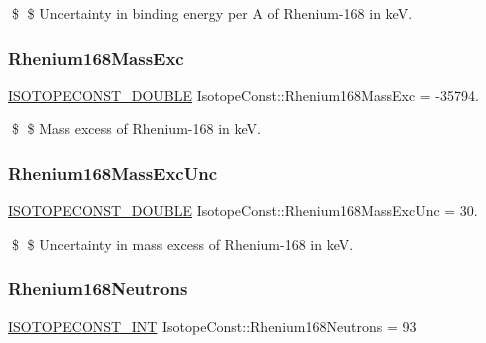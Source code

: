\$ \$ Uncertainty in binding energy per A of Rhenium-\/168 in keV. \mbox{\label{group___isotope_const-_rhenium-_re168_ga28ca4cb28f5745cd65079990032e2e33}} 
\subsubsection{\texorpdfstring{Rhenium168\+Mass\+Exc}{Rhenium168MassExc}}
{\footnotesize\ttfamily \mbox{\hyperlink{group___isotope_const-_macros_ga8f45a7272ce02c0b4c65c44636ed719a}{I\+S\+O\+T\+O\+P\+E\+C\+O\+N\+S\+T\+\_\+\+D\+O\+U\+B\+LE}} Isotope\+Const\+::\+Rhenium168\+Mass\+Exc = -\/35794.}

\$ \$ Mass excess of Rhenium-\/168 in keV. \mbox{\label{group___isotope_const-_rhenium-_re168_gaa5b128af90213c085656303fe72d94f8}} 
\subsubsection{\texorpdfstring{Rhenium168\+Mass\+Exc\+Unc}{Rhenium168MassExcUnc}}
{\footnotesize\ttfamily \mbox{\hyperlink{group___isotope_const-_macros_ga8f45a7272ce02c0b4c65c44636ed719a}{I\+S\+O\+T\+O\+P\+E\+C\+O\+N\+S\+T\+\_\+\+D\+O\+U\+B\+LE}} Isotope\+Const\+::\+Rhenium168\+Mass\+Exc\+Unc = 30.}

\$ \$ Uncertainty in mass excess of Rhenium-\/168 in keV. \mbox{\label{group___isotope_const-_rhenium-_re168_gabc51b2d3747ca9aaefa3123356f700ca}} 
\subsubsection{\texorpdfstring{Rhenium168\+Neutrons}{Rhenium168Neutrons}}
{\footnotesize\ttfamily \mbox{\hyperlink{group___isotope_const-_macros_ga5f18360b3e99483a35c32d789e62621c}{I\+S\+O\+T\+O\+P\+E\+C\+O\+N\+S\+T\+\_\+\+I\+NT}} Isotope\+Const\+::\+Rhenium168\+Neutrons = 93}

